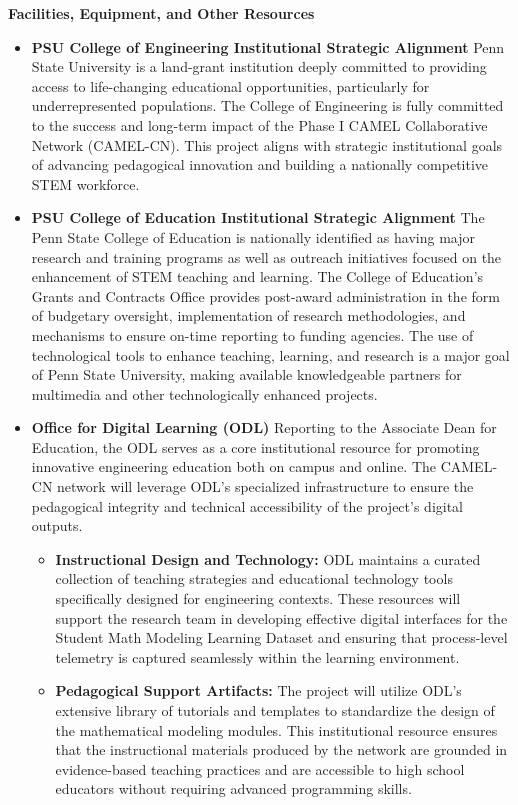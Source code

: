 \documentclass[11pt]{article}
\begin{document}
\noindent \textbf{Facilities, Equipment, and Other Resources}

\begin{itemize}

\item \textbf{PSU College of Engineering Institutional Strategic Alignment}
Penn State University is a land-grant institution deeply committed to providing access to life-changing educational opportunities, particularly for underrepresented populations. The College of Engineering is fully committed to the success and long-term impact of the Phase I CAMEL Collaborative Network (CAMEL-CN). This project aligns with strategic institutional goals of advancing pedagogical innovation and building a nationally competitive STEM workforce.

\item \textbf{PSU College of Education Institutional Strategic Alignment}
The Penn State College of Education is nationally identified as having major research and training programs as well as outreach initiatives focused on the enhancement of STEM teaching and learning. The College of Education’s Grants and Contracts Office provides post-award administration in the form of budgetary oversight, implementation of research methodologies, and mechanisms to ensure on-time reporting to funding agencies. The use of technological tools to enhance teaching, learning, and research is a major goal of Penn State University, making available knowledgeable partners for multimedia and other technologically enhanced projects.

\item \textbf{Office for Digital Learning (ODL)}
Reporting to the Associate Dean for Education, the ODL serves as a core institutional resource for promoting innovative engineering education both on campus and online. The CAMEL-CN network will leverage ODL’s specialized infrastructure to ensure the pedagogical integrity and technical accessibility of the project's digital outputs.
    \begin{itemize}[noitemsep]
        \item \textbf{Instructional Design and Technology:} ODL maintains a curated collection of teaching strategies and educational technology tools specifically designed for engineering contexts. These resources will support the research team in developing effective digital interfaces for the Student Math Modeling Learning Dataset and ensuring that process-level telemetry is captured seamlessly within the learning environment.
        \item \textbf{Pedagogical Support Artifacts:} The project will utilize ODL’s extensive library of tutorials and templates to standardize the design of the mathematical modeling modules. This institutional resource ensures that the instructional materials produced by the network are grounded in evidence-based teaching practices and are accessible to high school educators without requiring advanced programming skills.
    \end{itemize}


\end{itemize}
\end{document}
